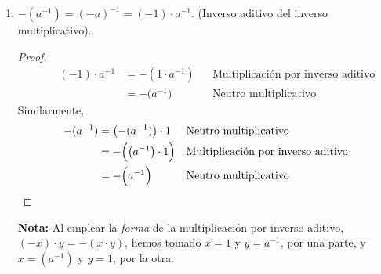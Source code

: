 \documentclass[11pt]{article}
\begin{document}
\begin{enumerate}[label=\alph*)]
\begin{enumerate}[label=\roman*)]



  \item $-(a^{-1})=(-a)^{-1}=(-1)\cdot a^{-1}$. (Inverso aditivo del inverso multiplicativo).
  \begin{proof} 
  \begin{align*}
  \qquad (-1)\cdot a^{-1} &= -(1\cdot a^{-1}) && \text{Multiplicación por inverso aditivo}\\
  \qquad &= -\bigl(a^{-1}\bigr) && \text{Neutro multiplicativo}
  \end{align*}
  Similarmente,
  \begin{align*}
   -(a^{-1}) &= \bigl(-(a^{-1})\bigr) \cdot 1 && \text{Neutro multiplicativo}\\
   &= -\Bigl(\qty(a^{-1})\cdot 1\Bigr) && \text{Multiplicación por inverso aditivo}\\
   &= -\Bigl(a^{-1}\Bigr) && \text{Neutro multiplicativo} \qedhere
  \end{align*}
  \end{proof}
  \textbf{Nota:} Al emplear la \textit{forma} de la multiplicación por inverso aditivo, $(-x)\cdot y = -(x\cdot y)$, hemos tomado $x=1$ y $y=a^{-1}$, por una parte, y $x=(a^{-1})$ y $y=1$, por la otra.
 \end{enumerate}%

\end{enumerate}
\end{document}
